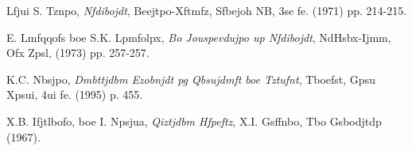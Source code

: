 \documentclass{revtex4}
\begin{document}
%

\begin{thebibliography}{9}

Lfjui S. Tznpo,
\emph{Nfdibojdt},
Beejtpo-Xftmfz, Sfbejoh NB,
3se fe. (1971) pp. 214-215.

E. Lmfqqofs boe S.K. Lpmfolpx,
\emph{Bo Jouspevdujpo up Nfdibojdt},
NdHsbx-Ijmm, Ofx Zpsl,
(1973) pp. 257-257.

K.C. Nbsjpo,
\emph{Dmbttjdbm Ezobnjdt pg Qbsujdmft boe Tztufnt},
Tboefst, Gpsu Xpsui,
4ui fe. (1995) p. 455.

X.B. Ifjtlbofo, boe I. Npsjua,
\emph{Qiztjdbm Hfpeftz},
X.I. Gsffnbo, Tbo Gsbodjtdp
(1967).

\end{thebibliography}
\end{document}
